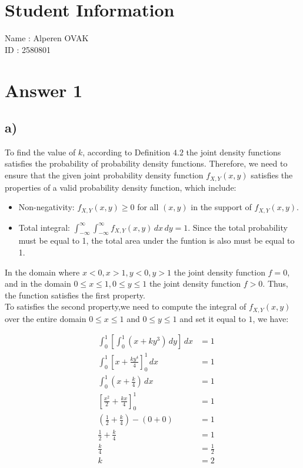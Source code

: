 \documentclass[12pt]{article}
\begin{document}
\section*{Student Information}

Name : Alperen OVAK \\

ID : 2580801\\


\section*{Answer 1}
\subsection*{a)} 

To find the value of $k$, according to Definition $4.2$ the joint density functions satisfies the probability of probability density functions. Therefore, we need to ensure that the given joint probability density function $f_{X,Y}(x,y)$ satisfies the properties of a valid probability density function, which include:
\begin{itemize}
    \item Non-negativity: $f_{X,Y}(x,y) \geq 0$ for all $(x,y)$ in the support of $f_{X,Y}(x,y)$.
    \item Total integral: $\int_{-\infty}^{\infty} \int_{-\infty}^{\infty} f_{X,Y}(x,y) \, dx \, dy = 1$. Since the total probability must be equal to 1, the total area under the funtion is also must be equal to 1.
\end{itemize}
In the domain where $ { x<0,x > 1,y < 0, y > 1 }$ the joint density function $ f=0 $, and in the domain $ {0 \leq x \leq 1, 0 \leq y \leq 1} $ the joint density function $ f > 0 $. Thus, the function satisfies the first property.\\

To satisfies the second property,we need to compute the integral of $f_{X,Y}(x,y)$ over the entire domain $0 \leq x \leq 1$ and $0 \leq y \leq 1$ and set it equal to $1$, we have:

\[
\begin{aligned}
&\int_{0}^{1} \left[ \int_{0}^{1} (x+ky^3) \, dy \right] \, dx &= 1 \\
&\int_{0}^{1} \left[ x + \frac{ky^4}{4} \right]_0^1 \, dx &= 1 \\
&\int_{0}^{1} \left( x + \frac{k}{4} \right) \, dx &= 1 \\
&\left[ \frac{x^2}{2} + \frac{kx}{4} \right]_0^1 &= 1 \\
&\left( \frac{1}{2} + \frac{k}{4} \right) - \left( 0 + 0 \right) &= 1 \\
&\frac{1}{2} + \frac{k}{4} &= 1 \\
&\frac{k}{4} &= \frac{1}{2} \\
&k &= 2 \\
\end{aligned}
\]
\end{document}
